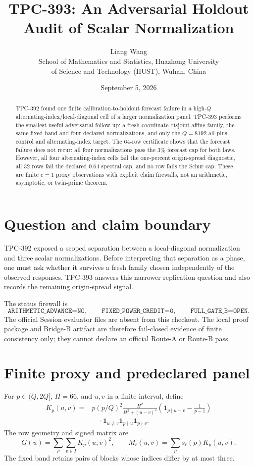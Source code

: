 \documentclass[10pt]{article}
\title{TPC-393: An Adversarial Holdout Audit of Scalar Normalization}
\author{Liang Wang\\
School of Mathematics and Statistics, Huazhong University\\
of Science and Technology (HUST), Wuhan, China}
\date{September 5, 2026}
\begin{document}
\maketitle

\begin{abstract}
TPC-392 found one finite calibration-to-holdout forecast failure in a
high-$Q$ alternating-index/local-diagonal cell of a larger normalization
panel.  TPC-393 performs the smallest useful adversarial follow-up: a fresh
coordinate-disjoint affine family, the same fixed band and four declared
normalizations, and only the $Q=8192$ all-plus control and alternating-index
target.  The 64-row certificate shows that the forecast failure does not
recur: all four normalizations pass the $3\%$ forecast cap for both laws.
However, all four alternating-index cells fail the one-percent origin-spread
diagnostic, all 32 rows fail the declared $0.64$ spectral cap, and no row
fails the Schur cap.  These are finite $c=1$ proxy observations with explicit
claim firewalls, not an arithmetic, asymptotic, or twin-prime theorem.
\end{abstract}

\section{Question and claim boundary}

TPC-392 exposed a scoped separation between a local-diagonal normalization
and three scalar normalizations.  Before interpreting that separation as a
phase, one must ask whether it survives a fresh family chosen independently
of the observed responses.  TPC-393 answers this narrower replication
question and also records the remaining origin-spread signal.

The status firewall is
\[
 \texttt{ARITHMETIC\_ADVANCE=NO},\qquad
 \texttt{FIXED\_POWER\_CREDIT=0},\qquad
 \texttt{FULL\_GATE\_B=OPEN}.
\]
The official Session evaluator files are absent from this checkout.  The
local proof package and Bridge-B artifact are therefore fail-closed evidence
of finite consistency only; they cannot declare an official Route-A or
Route-B pass.

\section{Finite proxy and predeclared panel}

For $p\in(Q,2Q]$, $H=66$, and $u,v$ in a finite interval, define
\begin{align*}
 K_p(u,v)={}&p(p/Q)^2\frac{H^2}{H^2+(u-v)^2}
 \left(\mathbf 1_{p\mid u-v}-\frac{1}{p-1}\right)\\
 &\quad\cdot\mathbf 1_{u\ne v}\mathbf 1_{p\nmid u}\mathbf 1_{p\nmid v}.
\end{align*}
The row geometry and signed matrix are
\[
 G(u)=\sum_p\sum_{v\in I}K_p(u,v)^2,
 \qquad M_\ell(u,v)=\sum_p s_\ell(p)K_p(u,v).
\]
The fixed band retains pairs of blocks whose indices differ by at most three.
\end{document}
